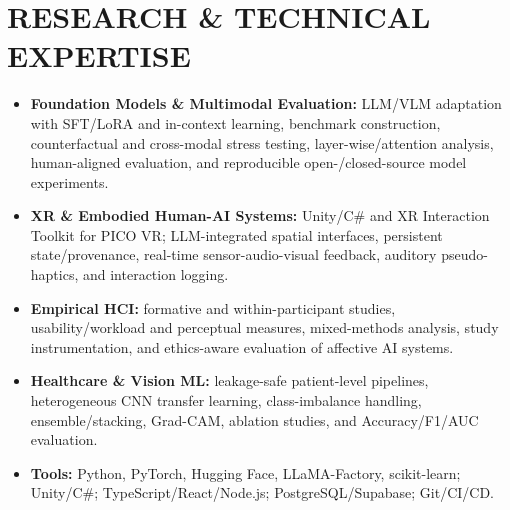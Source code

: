 \documentclass[a4paper,10pt]{extarticle}
\begin{document}
\section*{RESEARCH \& TECHNICAL EXPERTISE}
\begin{itemize}
    \item \textbf{Foundation Models \& Multimodal Evaluation:} LLM/VLM adaptation with SFT/LoRA and in-context learning, benchmark construction, counterfactual and cross-modal stress testing, layer-wise/attention analysis, human-aligned evaluation, and reproducible open-/closed-source model experiments.
    \item \textbf{XR \& Embodied Human-AI Systems:} Unity/C\# and XR Interaction Toolkit for PICO VR; LLM-integrated spatial interfaces, persistent state/provenance, real-time sensor-audio-visual feedback, auditory pseudo-haptics, and interaction logging.
    \item \textbf{Empirical HCI:} formative and within-participant studies, usability/workload and perceptual measures, mixed-methods analysis, study instrumentation, and ethics-aware evaluation of affective AI systems.
    \item \textbf{Healthcare \& Vision ML:} leakage-safe patient-level pipelines, heterogeneous CNN transfer learning, class-imbalance handling, ensemble/stacking, Grad-CAM, ablation studies, and Accuracy/F1/AUC evaluation.
    \item \textbf{Tools:} Python, PyTorch, Hugging Face, LLaMA-Factory, scikit-learn; Unity/C\#; TypeScript/React/Node.js; PostgreSQL/Supabase; Git/CI/CD.
\end{itemize}
\end{document}
